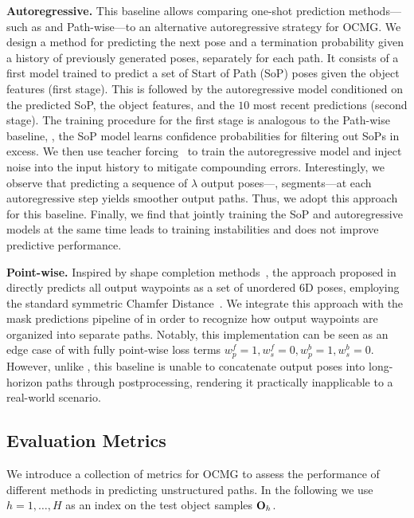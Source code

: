 \noindent \textbf{Autoregressive.}
%
This baseline allows comparing one-shot prediction methods---such as \ours and Path-wise---to an alternative autoregressive strategy for OCMG.
%
We design a method for predicting the next pose and a termination probability given a history of previously generated poses, separately for each path. 
It consists of a first model trained to predict a set of Start of Path (SoP) poses given the object features (first stage). This is followed by the autoregressive model conditioned on the predicted SoP, the object features, and the $10$ most recent predictions (second stage).
The training procedure for the first stage is analogous to the Path-wise baseline, \ie, the SoP model learns confidence probabilities for filtering out SoPs in excess.
We then use teacher forcing~\cite{teacherforcing} to train the autoregressive model and inject noise into the input history to mitigate compounding errors.
Interestingly, we observe that predicting a sequence of $\lambda$ output poses---\ie, segments---at each autoregressive step yields smoother output paths.
Thus, we adopt this approach for this baseline.
Finally, we find that jointly training the SoP and autoregressive models at the same time
leads to training instabilities and does not improve predictive performance.

\noindent \textbf{Point-wise.}
Inspired by shape completion methods~\cite{Yuan_Pcn_2018}, the approach proposed in \cite{tiboni2023paintnet} directly predicts all output waypoints as a set of unordered 6D poses, employing the standard symmetric Chamfer Distance~\cite{Fan_Point_2017}.
We integrate this approach with the mask predictions pipeline of \ours in order to recognize how output waypoints are organized into separate paths.
Notably, this implementation can be seen as an edge case of \ours with fully point-wise loss terms $w^f_p{=}1,w^f_s{=}0,w^b_p{=}1,w^b_s{=}0$.
%
However, unlike \ours, this baseline is unable to concatenate output poses into long-horizon paths through postprocessing, rendering it practically inapplicable to a real-world scenario.



\subsection{Evaluation Metrics}
\label{sec:eval_metrics}
We introduce a collection of metrics for OCMG to assess the performance of different methods in predicting unstructured paths. In the following we use $h{=}1,\ldots,H$ as an index on the test object samples $\mathbf{O}_h$. 

